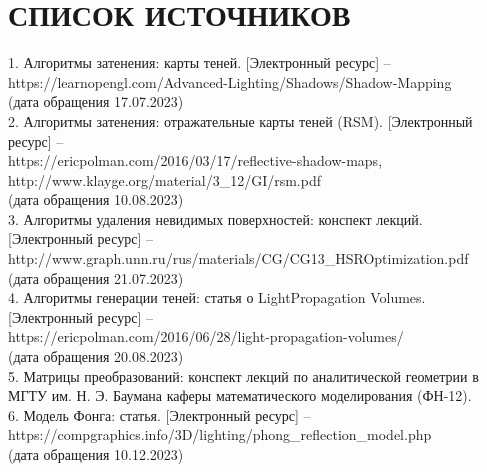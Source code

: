 \chapter*{СПИСОК ИСТОЧНИКОВ}

\hspace{-1.25cm}
1. Алгоритмы затенения: карты теней.
[Электронный ресурс] -- \\
{https://learnopengl.com/Advanced-Lighting/Shadows/Shadow-Mapping} \\
(дата обращения 17.07.2023) \\

\hspace{-1.25cm}
2. Алгоритмы затенения: отражательные карты теней (RSM).
[Электронный ресурс] -- \\
{https://ericpolman.com/2016/03/17/reflective-shadow-maps}, \\
{http://www.klayge.org/material/3\_12/GI/rsm.pdf} \\
(дата обращения 10.08.2023) \\

\hspace{-1.25cm}
3. Алгоритмы удаления невидимых поверхностей: конспект лекций.
[Электронный ресурс] -- \\
{http://www.graph.unn.ru/rus/materials/CG/CG13\_HSROptimization.pdf} \\
(дата обращения 21.07.2023) \\

\hspace{-1.25cm}
4. Алгоритмы генерации теней: статья о LightPropagation Volumes.
[Электронный ресурс] -- \\
{https://ericpolman.com/2016/06/28/light-propagation-volumes/} \\
(дата обращения 20.08.2023) \\

\hspace{-1.25cm}
5. Матрицы преобразований: конспект лекций по аналитической геометрии в
МГТУ им. Н. Э. Баумана каферы математического моделирования (ФН-12). \\

\hspace{-1.25cm}
6. Модель Фонга: статья. [Электронный ресурс] -- \\
{https://compgraphics.info/3D/lighting/phong\_reflection\_model.php} \\
(дата обращения 10.12.2023) \\

